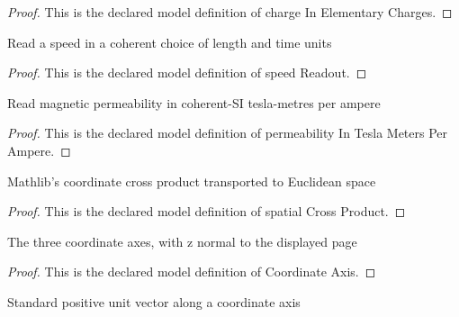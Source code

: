 \begin{proof}
  This is the declared model definition of charge In Elementary Charges.
\end{proof}
\begin{definition}
  \label{def:physics:phyx-mini-0959:phyxminiproblems-problemphyxmini0959-speedreadout}
  Read a speed in a coherent choice of length and time units
\end{definition}
\begin{proof}
  This is the declared model definition of speed Readout.
\end{proof}
\begin{definition}
  \label{def:physics:phyx-mini-0959:phyxminiproblems-problemphyxmini0959-permeabilityinteslametersperampere}
  Read magnetic permeability in coherent-SI tesla-metres per ampere
\end{definition}
\begin{proof}
  This is the declared model definition of permeability In Tesla Meters Per Ampere.
\end{proof}
\begin{definition}
  \label{def:physics:phyx-mini-0959:phyxminiproblems-problemphyxmini0959-spatialcrossproduct}
  Mathlib's coordinate cross product transported to Euclidean space
\end{definition}
\begin{proof}
  This is the declared model definition of spatial Cross Product.
\end{proof}
\begin{definition}
  \label{def:physics:phyx-mini-0959:phyxminiproblems-problemphyxmini0959-coordinateaxis}
  The three coordinate axes, with z normal to the displayed page
\end{definition}
\begin{proof}
  This is the declared model definition of Coordinate Axis.
\end{proof}
\begin{definition}
  \label{def:physics:phyx-mini-0959:phyxminiproblems-problemphyxmini0959-axisvector}
  Standard positive unit vector along a coordinate axis
\end{definition}
